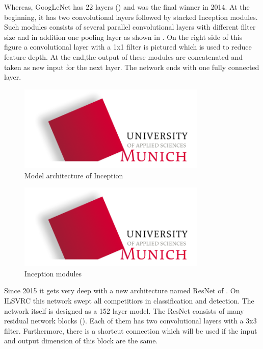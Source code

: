 Whereas, GoogLeNet has 22 layers () and was the final winner in 2014. At the beginning, it has two convolutional layers followed by stacked Inception modules. Such modules consists of several parallel convolutional layers with different filter size and in addition one pooling layer as shown in . On the right side of this figure a convolutional layer with a 1x1 filter is pictured which is used to reduce feature depth. At the end,the output of these modules are concatenated and taken as new input for the next layer. The network ends with one fully connected layer.\\

\begin{figure}[htbp]
\includegraphics[width=0.8\textwidth]{includes/MUASlogo}
\caption[Model architecture of Inception]{Model architecture of Inception \citep{Szegedy2014}}
\label{fig:FH-Logo4}
\end{figure}

\begin{figure}[htbp]
\includegraphics[width=0.8\textwidth]{includes/MUASlogo}
\caption[Inception modules]{Inception modules \citep{Szegedy2014}}
\label{fig:FH-Logo5}
\end{figure}

Since 2015 it gets very deep with a new architecture named ResNet of \citet{HE2015}. On ILSVRC this network swept all competitiors in classification and detection. The network itself is designed as a 152 layer model. The ResNet consists of many residual network blocks (). Each of them has two convolutional layers with a 3x3 filter. Furthermore, there is a shortcut connection which will be used if the input and output dimension of this block are the same.

